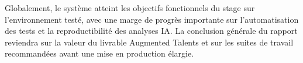Globalement, le système atteint les objectifs fonctionnels du stage sur l'environnement testé, avec une marge de progrès importante sur l'automatisation des tests et la reproductibilité des analyses IA. La conclusion générale du rapport reviendra sur la valeur du livrable Augmented Talents et sur les suites de travail recommandées avant une mise en production élargie.
